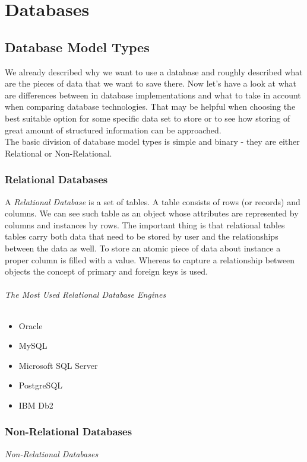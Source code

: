 \chapter{Databases}

\section{Database Model Types}

We already described why we want to use a database and roughly described what are the pieces of data that we want to save there. 
Now let's have a look at what are differences between in database implementations and what to take in account when comparing database technologies.
That may be helpful when choosing the best suitable option for some specific data set to store or to see how storing of great amount of structured information can be approached. \\ 

The basic division of database model types is simple and binary - they are either Relational or Non-Relational. 

\subsection{Relational Databases}
A \textit{Relational Database} is a set of tables. A table consists of rows (or records) and columns. We can see such table as an object whose attributes are represented by columns and instances by rows. 
The important thing is that relational tables tables carry both data that need to be stored by user and the relationships between the data as well. 
To store an atomic piece of data about instance a proper column is filled with a value.
Whereas to capture a relationship between objects the concept of primary and foreign keys is used. 

\subparagraph{The Most Used Relational Database Engines}

\begin{itemize}
	\item Oracle
	\item MySQL
	\item Microsoft SQL Server
	\item PostgreSQL
	\item IBM Db2
\end{itemize}

\subsection{Non-Relational Databases} 
\textit{Non-Relational Databases}

